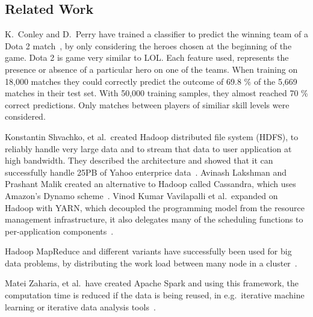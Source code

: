 \subsection{Related Work}\label{sec:relatedwork}
K.\ Conley and D.\ Perry have trained a classifier to predict the winning team of a Dota 2 match~\cite{dota2article}, by only considering the heroes chosen at the beginning of the game. Dota 2 is game very similar to LOL.\@
Each feature used, represents the presence or absence of a particular hero on one of the teams.
When training on 18,000 matches they could correctly predict the outcome of 69.8 \% of the 5,669 matches in their test set.
With 50,000 training samples, they almost reached 70 \% correct predictions. Only matches between players of similiar skill levels were considered.

Konstantin Shvachko, et al.\, created Hadoop distributed file system (HDFS), to reliably handle very large data and to stream that data to user application at high bandwidth. They described the architecture and showed that it can successfully handle 25PB of Yahoo enterprice data~\cite{HDFS}.
Avinash Lakshman and Prashant Malik created an alternative to Hadoop called Cassandra, which uses Amazon's Dynamo scheme~\cite{ApacheCassandra}.
Vinod Kumar Vavilapalli et al.\ expanded on Hadoop with YARN, which decoupled the programming model from the resource management infrastructure, it also delegates many of the scheduling functions to per-application components~\cite{ApacheHadoopYARN}.

Hadoop MapReduce and different variants have successfully been used for big data problems, by distributing the work load between many node in a cluster~\cite{DeanMapReduce}. 

Matei Zaharia, et al.\ have created Apache Spark and using this framework, the computation time is reduced if the data is being reused, in e.g.\ iterative machine learning or iterative data analysis tools~\cite{ApacheSpark}.


